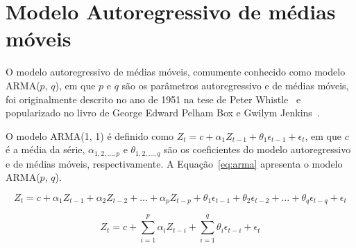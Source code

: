 \section{Modelo Autoregressivo de médias móveis}

O modelo autoregressivo de médias móveis, comumente conhecido como modelo
ARMA($p$, $q$), em que $p$ e $q$ são os parâmetros autoregressivo e de médias
móveis, foi originalmente descrito no ano de 1951 na
tese de Peter Whistle~\citep{Livro:whitle1951hypothesis} e popularizado no livro
de George Edward Pelham Box e Gwilym Jenkins~\citep{Livro:box1976times}.


O modelo ARMA(1, 1) é definido como $Z_t = c + \alpha_{1} Z_{t-1} +
\theta_{1}\epsilon_{t-1} + \epsilon_t$, em que $c$ é a média da série,
$\alpha_{1, 2, \hdots, p}$ e $\theta_{1, 2, \hdots, q}$ são os coeficientes
do modelo autoregressivo e de médias móveis, respectivamente. A
Equação~\ref{eq:arma} apresenta o modelo ARMA($p$, $q$).

\[
Z_t = c + \alpha_1Z_{t-1} + \alpha_2Z_{t-2} + \hdots + \alpha_pZ_{t-p} +
\theta_1\epsilon_{t-1} + \theta_2\epsilon_{t-2} + \hdots +
\theta_q\epsilon_{t-q} + \epsilon_t
\]

\begin{equation}
Z_t = c + \sum_{i=1}^p \alpha_iZ_{t-i} + \sum_{i=1}^q \theta_i\epsilon_{t-i} +
\epsilon_t
\label{eq:arma}
\end{equation}







